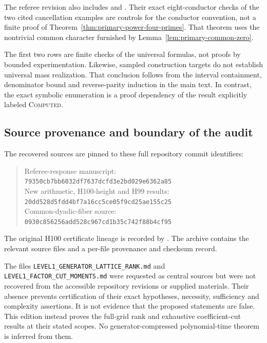 \documentclass[11pt]{article}
\numberwithin{equation}{section}
\theoremstyle{definition}
\theoremstyle{remark}
\begin{document}
The referee revision also includes
 and
.
Their exact eight-conductor checks of the two cited cancellation examples
are controls for the conductor convention, not a finite proof of
Theorem~\ref{thm:primary-power-four-primes}. That theorem uses the
nontrivial common character furnished by
Lemma~\ref{lem:primary-common-zero}.

The first two rows are finite checks of the universal formulas, not proofs
by bounded experimentation. Likewise, sampled construction targets do not
establish universal mass realization. That conclusion follows from the
interval containment, denominator bound and reverse-parity induction in
the main text. In contrast, the exact symbolic enumeration is a proof
dependency of the result explicitly labeled \textsc{Computed}.

\subsection{Source provenance and boundary of the audit}
The recovered sources are pinned to these full repository commit identifiers:
\begin{quote}\small
Referee-response manuscript:\\
\texttt{79350cb7bb6032df7637dcfd3e2bd029e6362a85}\\[.4em]
New arithmetic, H100-height and H99 results:\\
\texttt{20dd528d5fdd4bf7a16cc5ce05f9cd25ae155c25}\\[.4em]
Common-dyadic-fiber source:\\
\texttt{0930c856256add528c967cd1b35c742f88b4cf95}
\end{quote}
The original H100 certificate lineage is recorded by
\cite{ConstructionH100,ReviewPackageH100}. The archive contains the relevant
source files and a per-file provenance and checksum record.

The files \texttt{LEVEL1\_GENERATOR\_LATTICE\_RANK.md} and
\texttt{LEVEL1\_FACTOR\_CUT\_MOMENTS.md} were requested as central sources
but were not recovered from the accessible repository revisions or supplied
materials. Their absence prevents certification of their exact hypotheses,
necessity, sufficiency and complexity assertions. It is not evidence that
the proposed statements are false. This edition instead proves the full-grid
rank and exhaustive coefficient-cut results at their stated scopes.
No generator-compressed polynomial-time theorem is inferred from them.
\end{document}
